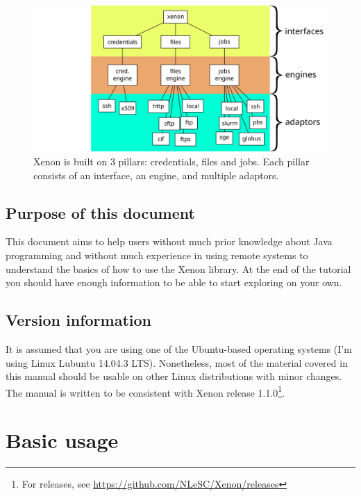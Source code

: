 \documentclass[12pt, a4paper, twoside, openany, titlepage]{book}
\begin{document}
\begin{figure}[ht]
\centering
\includegraphics[width=1.0\columnwidth]{images/xenon-design}
\caption{\label{fig:xenon-design} Xenon is built on 3 pillars: credentials, files and jobs. Each pillar consists of an interface, an engine, and multiple adaptors.}
\end{figure}


\section{Purpose of this document}

This document aims to help users without much prior knowledge about Java programming and without much experience in using remote systems to understand the basics of how to use the Xenon library. At the end of the tutorial you should have enough information to be able to start exploring on your own.

\section{Version information}

It is assumed that you are using one of the Ubuntu-based operating systems (I'm using Linux Lubuntu 14.04.3 LTS). Nonetheless, most of the material covered in this manual should be usable on other Linux distributions with minor changes. The manual is written to be consistent with Xenon release 1.1.0\footnote{For releases, see \url{https://github.com/NLeSC/Xenon/releases}}.






\chapter{Basic usage}
\end{document}
